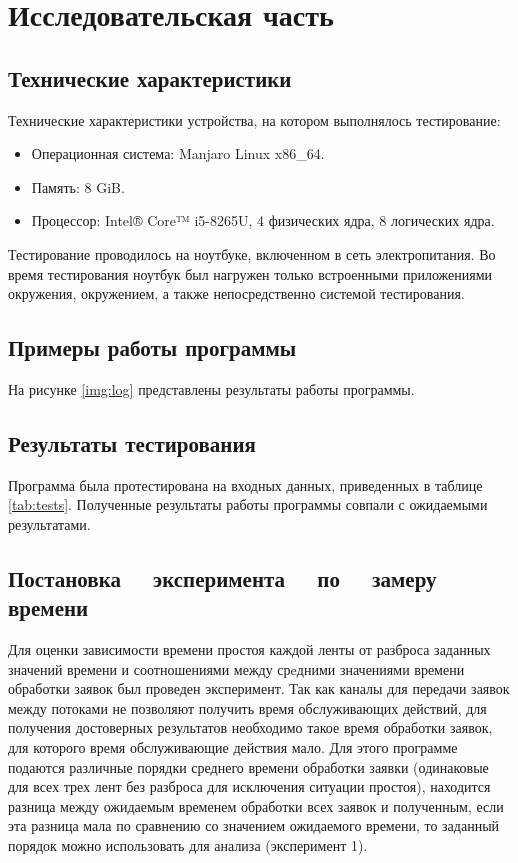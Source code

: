 \chapter{Исследовательская часть}

\section{Технические характеристики}

Технические характеристики устройства, на котором выполнялось тестирование:

\begin{itemize}
	\item Операционная система: Manjaro \cite{manjaro} Linux x86\_64.
	\item Память: 8 GiB.
    \item Процессор: Intel® Core™ i5-8265U, 4 физических ядра, 8 логических
        ядра\cite{intel}.
\end{itemize}

Тестирование проводилось на ноутбуке, включенном в сеть электропитания. Во
время тестирования ноутбук был нагружен только встроенными приложениями
окружения, окружением, а также непосредственно системой тестирования.

\section{Примеры работы программы}

На рисунке \ref{img:log} представлены результаты работы программы.



\section{Результаты тестирования}

Программа была протестирована на входных данных, приведенных в таблице
\ref{tab:tests}. Полученные результаты работы программы совпали с ожидаемыми
результатами.

\section[Постановка эксперимента по замеру времени]
        {Постановка ~~эксперимента ~~по ~~замеру времени}

Для оценки зависимости времени простоя каждой ленты от разброса заданных
значений времени и соотношениями между срeдними значениями времени обработки
заявок был проведен эксперимент. Так как каналы для передачи заявок между
потоками не позволяют получить время обслуживающих действий, для получения
достоверных результатов необходимо такое время обработки заявок, для которого
время обслуживающие действия мало. Для этого программе подаются различные
порядки среднего времени обработки заявки (одинаковые для всех трех лент без
разброса для исключения ситуации простоя), находится разница между ожидаемым
временем обработки всех заявок и полученным, если эта разница мала по сравнению
со значением ожидаемого времени, то заданный порядок можно использовать
для анализа (эксперимент 1).

